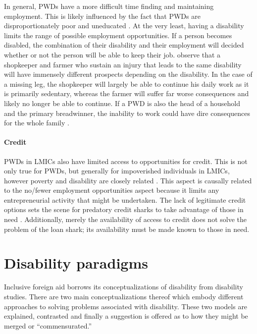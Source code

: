 \documentclass[a4paper]{article}
\begin{document}
In general, PWDs have a more difficult time finding and maintaining
employment. This is likely influenced by the fact that PWDs are
disproportionately poor and uneducated \citep{lamichhane2014nexus}. At the very
least, having a disability limits the range of possible employment
opportunities. If a person becomes disabled, the combination of their
disability and their employment will decided whether or not the person will be
able to keep their job. \cite{chowdhury2006economics} observe that a
shopkeeper and farmer who sustain an injury that leads to the same disability
will have immensely different prospects depending on the disability. In the
case of a missing leg, the shopkeeper will largely be able to continue his
daily work as it is primarily sedentary, whereas the farmer will suffer far
worse consequences and likely no longer be able to continue. If a PWD is also
the head of a household and the primary breadwinner, the inability to work
could have dire consequences for the whole family \citep{world2011world}.

\paragraph{Credit}

PWDs in LMICs also have limited access to opportunities for credit. This is
not only true for PWDs, but generally for impoverished individuals in LMICs,
however poverty and disability are closely related
\citep{palmer2011disability}. This aspect is causally related to the no/fewer
employment opportunities aspect because it limits any entrepreneurial activity
that might be undertaken. The lack of legitimate credit options sets the scene
for predatory credit sharks to take advantage of those in need
\citep{beisland2017exploring}. Additionally, merely the availability of access
to credit does not solve the problem of the loan shark; its availability must
be made known to those in need.

\newpage
\section{Disability paradigms}

Inclusive foreign aid borrows its conceptualizations of disability from
disability studies. There are two main conceptualizations thereof which embody
different approaches to solving problems associated with disability. These two
models are explained, contrasted and finally a suggestion is offered as to how
they might be merged or ``commensurated.''
\end{document}
